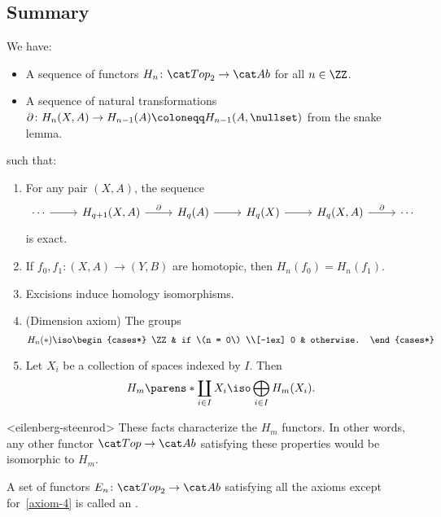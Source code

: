 \documentclass{standalone}
\begin{document}
\subsection{Summary}
We have:
\begin{itemize}[nosep]
  \item A sequence of functors \(H_n \colon \cTop_2 \to \cAb\)
  for all \(n \in \ZZ\).
  \item A sequence of natural transformations
  \(\partial \colon H_n(X, A) \to H_{n-1}(A) \coloneqq H_{n-1}(A, \nullset)\)
  from the snake lemma.
\end{itemize}
such that:
\begin{enumerate}[nosep]
  \item For any pair \((X, A)\), the sequence
  \[
    \begin{tikzcd}
      \cdots \ar[r] &
      H_{q+1}(X, A) \ar[r, "\partial"] &
      H_q(A) \ar[r] &
      H_q(X) \ar[r] &
      H_q(X, A) \ar[r, "\partial"] &
      \cdots
    \end{tikzcd}
  \]
  is exact.

  \item If \(f_0, f_1 \colon (X, A) \to (Y, B)\) are homotopic,
  then \(H_n(f_0) = H_n(f_1)\).

  \item Excisions induce homology isomorphisms.

  \item\label{axiom-4} (Dimension axiom) The groups
  \[
    H_n(*) \iso \begin{cases*}
      \ZZ & if \(n = 0\) \\[-1ex]
      0   & otherwise.
    \end{cases*}
  \]

  \item Let \(X_i\) be a collection of spaces
  indexed by \(I\). Then
  \[
    H_m\parens*{\coprod_{i \in I} X_i} \iso \bigoplus_{i \in I} H_m(X_i).
  \]
\end{enumerate}

\begin{theorem}<eilenberg-steenrod>
  These facts characterize the \(H_m\) functors.
  In other words, any other functor \(\cTop \to \cAb\)
  satisfying these properties would be isomorphic to \(H_m\).
\end{theorem}

\begin{remark}
   A set of functors \(E_n \colon \cTop_2 \to \cAb\) satisfying all the axioms
   except for~\ref{axiom-4} is called an .
\end{remark}
\end{document}
